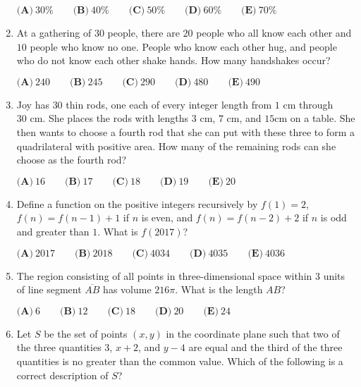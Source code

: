 \documentclass{article}
\begin{document}
\begin{enumerate}[label=\arabic*., itemsep=0.5em]
\(\textbf{(A)}\ 30\%\qquad\textbf{(B)}\ 40\%\qquad\textbf{(C)}\ 50\%\qquad\textbf{(D)}\ 60\%\qquad\textbf{(E)}\ 70\%\)\par \vspace{0.5em}\item At a gathering of \(30\) people, there are \(20\) people who all know each other and \(10\) people who know no one. People who know each other hug, and people who do not know each other shake hands. How many handshakes occur?

\(\textbf{(A)}\ 240\qquad\textbf{(B)}\ 245\qquad\textbf{(C)}\ 290\qquad\textbf{(D)}\ 480\qquad\textbf{(E)}\ 490\)\par \vspace{0.5em}\item Joy has \(30\) thin rods, one each of every integer length from \(1 \text{ cm}\) through \(30 \text{ cm}\). She places the rods with lengths \(3 \text{ cm}\), \(7 \text{ cm}\), and \(15 \text{cm}\) on a table. She then wants to choose a fourth rod that she can put with these three to form a quadrilateral with positive area. How many of the remaining rods can she choose as the fourth rod?

\(\textbf{(A)}\ 16 \qquad\textbf{(B)}\ 17 \qquad\textbf{(C)}\ 18 \qquad\textbf{(D)}\ 19  \qquad\textbf{(E)}\ 20\)\par \vspace{0.5em}\item Define a function on the positive integers recursively by \(f(1) = 2\), \(f(n) = f(n-1) + 1\) if \(n\) is even, and \(f(n) = f(n-2) + 2\) if \(n\) is odd and greater than \(1\). What is \(f(2017)\)?

\( \textbf{(A)}\ 2017 \qquad\textbf{(B)}\ 2018 \qquad\textbf{(C)}\ 4034 \qquad\textbf{(D)}\ 4035 \qquad\textbf{(E)}\ 4036\)\par \vspace{0.5em}\item The region consisting of all points in three-dimensional space within \(3\) units of line segment \(\overline{AB}\) has volume \(216 \pi\). What is the length \(AB\)?

\( \textbf{(A)}\ 6 \qquad\textbf{(B)}\ 12 \qquad\textbf{(C)}\ 18 \qquad\textbf{(D)}\ 20 \qquad\textbf{(E)}\ 24\)\par \vspace{0.5em}\item Let \(S\) be the set of points \((x,y)\) in the coordinate plane such that two of the three quantities \(3\), \(x+2\), and \(y-4\) are equal and the third of the three quantities is no greater than the common value. Which of the following is a correct description of \(S\)?


\end{enumerate}
\end{document}
